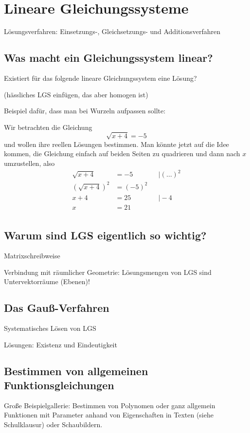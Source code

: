 \chapter{Lineare Gleichungssysteme}

Lösungsverfahren: Einsetzungs-, Gleichsetzungs- und Additionsverfahren

\section{Was macht ein Gleichungssystem linear?}

\begin{example}
   Existiert für das folgende lineare Gleichungssystem eine Lösung?

   (hässliches LGS einfügen, das aber homogen ist)
\end{example}

Beispiel dafür, dass man bei Wurzeln aufpassen sollte:
\begin{example}
    Wir betrachten die Gleichung 
    \begin{equation*}
        \sqrt{x+4} = -5
    \end{equation*}
    und wollen ihre reellen Lösungen bestimmen. Man könnte jetzt auf die Idee kommen, die Gleichung einfach auf beiden Seiten zu quadrieren und dann nach \(x\) umzustellen, also 
    \begin{align*}
        \sqrt{x+4} &= -5 && \mid (\dots)^2 \\
        (\sqrt{x+4})^2 &= (-5)^2 \\
        x+4 &= 25 && \mid -4 \\
        x &= 21 \\
    \end{align*}
\end{example}

\section{Warum sind LGS eigentlich so wichtig?}
Matrixschreibweise

Verbindung mit räumlicher Geometrie: Lösungsmengen von LGS sind Untervektorräume (Ebenen)!

\section{Das Gauß-Verfahren}
Systematisches Lösen von LGS 

Lösungen: Existenz und Eindeutigkeit

\section{Bestimmen von allgemeinen Funktionsgleichungen}
Große Beispielgallerie: Bestimmen von Polynomen oder ganz allgemein Funktionen mit Parameter anhand von Eigenschaften in Texten (siehe Schulklausur) oder Schaubildern. 